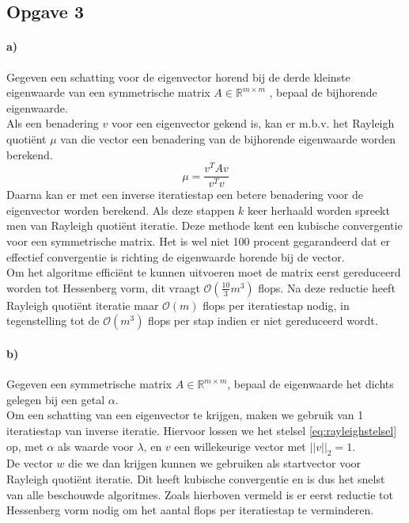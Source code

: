 \documentclass[a4paper, 12pt, titlepage]{report}
\begin{document}
\subsection{Opgave 3}
\paragraph{a)}
Gegeven een schatting voor de eigenvector horend bij de derde kleinste eigenwaarde van een symmetrische matrix $A \in \mathbb{R}^{m \times m}$ , bepaal de bijhorende eigenwaarde.\\
Als een benadering $v$ voor een eigenvector gekend is, kan er m.b.v. het Rayleigh quoti\"ent $\mu$ van die vector een benadering van de bijhorende eigenwaarde worden berekend.
\begin{equation}
	\mu = \frac{v^TAv}{v^Tv}
	\label{eqn:rayleighquotient}
\end{equation}
Daarna kan er met een inverse iteratiestap een betere benadering voor de eigenvector worden berekend. Als deze stappen $k$ keer herhaald worden spreekt men van Rayleigh quoti\"ent iteratie. Deze methode kent een kubische convergentie voor een symmetrische matrix. Het is wel niet 100 procent gegarandeerd dat er effectief convergentie is richting de eigenwaarde horende bij de vector. \\
Om het algoritme effici\"ent te kunnen uitvoeren moet de matrix eerst gereduceerd worden tot Hessenberg vorm, dit vraagt $\mathcal{O}(\frac{10}{3}m^3)$ flops. Na deze reductie heeft Rayleigh quoti\"ent iteratie maar $\mathcal{O}(m)$ flops per iteratiestap nodig, in tegenstelling tot de $\mathcal{O}(m^3)$ flops per stap indien er niet gereduceerd wordt. 
\paragraph{b)}
Gegeven een symmetrische matrix $A \in \mathbb{R}^{m \times m}$, bepaal de eigenwaarde het dichts gelegen bij een getal $\alpha$.\\
Om een schatting van een eigenvector te krijgen, maken we gebruik van 1 iteratiestap van inverse iteratie. Hiervoor lossen we het stelsel \eqref{eq:rayleighstelsel} op, met $\alpha$ als waarde voor $\lambda$, en $v$ een willekeurige vector met $||v||_2 = 1$.\\ 
De vector $w$ die we dan krijgen kunnen we gebruiken als startvector voor Rayleigh quoti\"ent iteratie. Dit heeft kubische convergentie en is dus het snelst van alle beschouwde algoritmes. Zoals hierboven vermeld is er eerst reductie tot Hessenberg vorm nodig om het aantal flops per iteratiestap te verminderen. 
\end{document}
